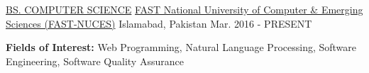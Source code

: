 


\begin{cventries}


\cventry
{\href{http://www.nu.edu.pk/Program/BS(CS)}{BS. COMPUTER SCIENCE}} %
{\href{http://www.nu.edu.pk/}{FAST National University of Computer \& Emerging Sciences (FAST-NUCES)} } %
{Islamabad, Pakistan} %
{Mar. 2016 - PRESENT} %
{ %
\begin{cvitems}
\item { \textbf{Fields of Interest:}  Web Programming, Natural Language Processing, Software Engineering, Software Quality Assurance} 
\end{cvitems}
}


\end{cventries}